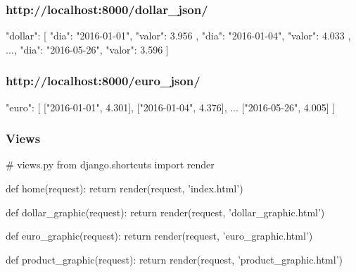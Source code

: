 \documentclass[aspectratio=169]{beamer}
\begin{document}
{\begin{frame}[fragile]

\end{frame}

\begin{frame}[fragile]\frametitle{http://localhost:8000/dollar\_json/}

\begin{jsoncode}
{
    "dollar": [{
            "dia": "2016-01-01",
            "valor": 3.956
        },
        {
            "dia": "2016-01-04",
            "valor": 4.033
        },
        ...,
        {
            "dia": "2016-05-26",
            "valor": 3.596
        }
    ]
}
\end{jsoncode}

\end{frame}

\begin{frame}[fragile]\frametitle{http://localhost:8000/euro\_json/}

\begin{jsoncode}
{
    "euro": [
        ["2016-01-01", 4.301],
        ["2016-01-04", 4.376],
        ...
        ["2016-05-26", 4.005]
    ]
}
\end{jsoncode}

\end{frame}

\begin{frame}[fragile]\frametitle{Views}
    
\begin{pythoncode}
# views.py
from django.shortcuts import render

def home(request):
    return render(request, 'index.html')

def dollar_graphic(request):
    return render(request, 'dollar_graphic.html')

def euro_graphic(request):
    return render(request, 'euro_graphic.html')

def product_graphic(request):
    return render(request, 'product_graphic.html')
\end{pythoncode}

\end{frame}

}
\end{document}
